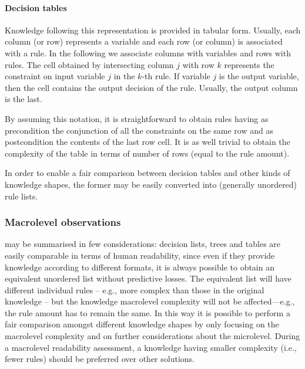 \documentclass[sigconf]{acmart}
\begin{document}
\paragraph{Decision tables}

Knowledge following this representation is provided in tabular form.
%
Usually, each column (or row) represents a variable and each row (or column) is associated with a rule.
%
In the following we associate columns with variables and rows with rules.
%
The cell obtained by intersecting column $j$ with row $k$ represents the constraint on input variable $j$ in the $k$-th rule.
%
If variable $j$ is the output variable, then the cell contains the output decision of the rule.
%
Usually, the output column is the last.

By assuming this notation, it is straightforward to obtain rules having as precondition the conjunction of all the constraints on the same row and as postcondition the contents of the last row cell.
%
It is as well trivial to obtain the complexity of the table in terms of number of rows (equal to the rule amount).

In order to enable a fair comparison between decision tables and other kinds of knowledge shapes, the former may be easily converted into (generally unordered) rule lists.

\subsubsection{Macrolevel observations}

 may be summarised in few considerations: decision lists, trees and tables are easily comparable in terms of human readability, since even if they provide knowledge according to different formats, it is always possible to obtain an equivalent unordered list without predictive losses.
%
The equivalent list will have different individual rules -- e.g., more complex than those in the original knowledge -- but the knowledge macrolevel complexity will not be affected---e.g., the rule amount has to remain the same.
%
In this way it is possible to perform a fair comparison amongst different knowledge shapes by only focusing on the macrolevel complexity and on further considerations about the microlevel.
%
During a macrolevel readability assessment, a knowledge having smaller complexity (i.e., fewer rules) should be preferred over other solutions.
\end{document}
